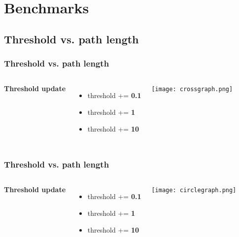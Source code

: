 \documentclass{beamer}
\begin{document}
\section{Benchmarks}

\subsection{Threshold vs. path length}


\begin{frame}
\frametitle{Threshold vs. path length}
\begin{columns}[c] %
\textbf{Threshold update}
\begin{itemize}
\item \textcolor{0.1}{threshold += \textbf{0.1}}
\item \textcolor{1}{threshold += \textbf{1}}
\item \textcolor{10}{threshold += \textbf{10}}
\end{itemize}

\begin{center}
	\texttt{[image: crossgraph.png]}
\end{center}
\end{columns}
\end{frame}


\begin{frame}
\frametitle{Threshold vs. path length}
\begin{columns}[c] %
\textbf{Threshold update}
\begin{itemize}
\item \textcolor{0.1}{threshold += \textbf{0.1}}
\item \textcolor{1}{threshold += \textbf{1}}
\item \textcolor{10}{threshold += \textbf{10}}
\end{itemize}

\begin{center}
	\texttt{[image: circlegraph.png]}
\end{center}
\end{columns}
\end{frame}
\end{document}
